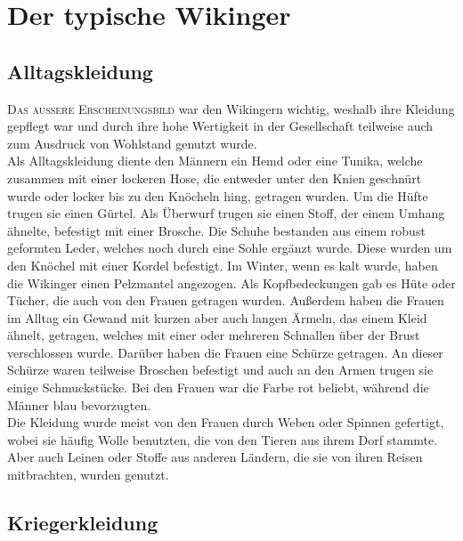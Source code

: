 \documentclass[12pt,a4paper,ngerman,openany]{book}
\newcommand{\flettrine}[2]{\lettrine[lines=2, depth=0, loversize=0.25, nindent=0.69pt, lraise=0.15]{\initfamily{#1}}{#2}}
\newcommand*\initfamily{\usefont{U}{GotIn}{xl}{n}}
\newcommand{\fchapter}[1]{\chapter{#1}\thispagestyle{chapterstyle}}
\begin{document}
\fchapter{Der typische Wikinger}


\section{Alltagskleidung}
\flettrine{D}{Das äussere Erscheinungsbild} war den Wikingern wichtig, weshalb ihre Kleidung gepflegt war und durch ihre hohe Wertigkeit in der Gesellschaft teilweise auch zum Ausdruck von Wohlstand genutzt wurde.\\
Als Alltagskleidung diente den Männern ein Hemd oder eine Tunika, welche zusammen mit einer lockeren Hose, die entweder unter den Knien geschnürt wurde oder locker bis zu den Knöcheln hing, getragen wurden. Um die Hüfte trugen sie einen Gürtel. Als Überwurf trugen sie einen Stoff, der einem Umhang ähnelte, befestigt mit einer Brosche. Die Schuhe bestanden aus einem robust geformten Leder, welches noch durch eine Sohle ergänzt wurde. Diese wurden um den Knöchel mit einer Kordel befestigt. Im Winter, wenn es kalt wurde, haben die Wikinger einen Pelzmantel angezogen. Als Kopfbedeckungen gab es Hüte oder Tücher, die auch von den Frauen getragen wurden. 
Außerdem haben die Frauen im Alltag ein Gewand mit kurzen aber auch langen Ärmeln, das einem Kleid ähnelt, getragen, welches mit einer oder mehreren Schnallen über der Brust verschlossen wurde. Darüber haben die Frauen eine Schürze getragen. An dieser Schürze waren teilweise Broschen befestigt und auch an den Armen trugen sie einige Schmuckstücke. Bei den Frauen war die Farbe rot beliebt, während die Männer blau bevorzugten.\\
Die Kleidung wurde meist von den Frauen durch Weben oder Spinnen gefertigt, wobei sie häufig Wolle benutzten, die von den Tieren aus ihrem Dorf stammte. Aber auch Leinen oder Stoffe aus anderen Ländern, die sie von ihren Reisen mitbrachten, wurden genutzt.

\section{Kriegerkleidung}
\end{document}
